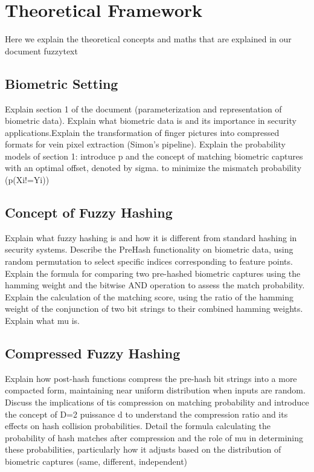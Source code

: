 \section{Theoretical Framework}
Here we explain the theoretical concepts and maths that are explained in our document fuzzytext

\subsection{Biometric Setting}
Explain section 1 of the document (parameterization and representation of biometric data). Explain what biometric data is and its importance in security applications.Explain the transformation of finger pictures into compressed formats for vein pixel extraction (Simon's pipeline). Explain the probability models of section 1: introduce p and the concept of matching biometric captures with an optimal offset, denoted by sigma. to minimize the mismatch probability (p(Xi!=Yi))

\subsection{Concept of Fuzzy Hashing}
Explain what fuzzy hashing is and how it is different from standard hashing in security systems. Describe the PreHash functionality on biometric data, using random permutation to select specific indices corresponding to feature points. Explain the formula for comparing two pre-hashed biometric captures using the hamming weight and the bitwise AND operation to assess the match probability. 
Explain the calculation of the matching score, using the ratio of the hamming weight of the conjunction of two bit strings to their combined hamming weights. Explain what mu is.

\subsection{Compressed Fuzzy Hashing}
Explain how post-hash functions compress the pre-hash bit strings into a more compacted form, maintaining near uniform distribution when inputs are random. Discuss the implications of tis compression on matching probability and introduce the concept of D=2 puissance d to understand the compression ratio and its effects on hash collision probabilities.
Detail the formula calculating the probability of hash matches after compression and the role of mu in determining these probabilities, particularly how it adjusts based on the distribution of biometric captures (same, different, independent)

